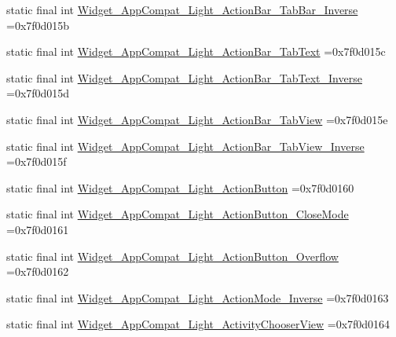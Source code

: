\begin{DoxyCompactItemize}
\item 
static final int \mbox{\hyperlink{classbr_1_1unb_1_1cic_1_1mp_1_1marketmaster_1_1R_1_1style_aef60f9fefc836dc33f25dd8e1fa12448}{Widget\+\_\+\+App\+Compat\+\_\+\+Light\+\_\+\+Action\+Bar\+\_\+\+Tab\+Bar\+\_\+\+Inverse}} =0x7f0d015b
\item 
static final int \mbox{\hyperlink{classbr_1_1unb_1_1cic_1_1mp_1_1marketmaster_1_1R_1_1style_a399c267c6d9f7e46b2148c53fac29347}{Widget\+\_\+\+App\+Compat\+\_\+\+Light\+\_\+\+Action\+Bar\+\_\+\+Tab\+Text}} =0x7f0d015c
\item 
static final int \mbox{\hyperlink{classbr_1_1unb_1_1cic_1_1mp_1_1marketmaster_1_1R_1_1style_a9665ad687a3f128cbe64b39dbbd7872e}{Widget\+\_\+\+App\+Compat\+\_\+\+Light\+\_\+\+Action\+Bar\+\_\+\+Tab\+Text\+\_\+\+Inverse}} =0x7f0d015d
\item 
static final int \mbox{\hyperlink{classbr_1_1unb_1_1cic_1_1mp_1_1marketmaster_1_1R_1_1style_af63349a9ca7a4644861fff2907588634}{Widget\+\_\+\+App\+Compat\+\_\+\+Light\+\_\+\+Action\+Bar\+\_\+\+Tab\+View}} =0x7f0d015e
\item 
static final int \mbox{\hyperlink{classbr_1_1unb_1_1cic_1_1mp_1_1marketmaster_1_1R_1_1style_aece7864dafcab4dac5964c53e0a3f5a1}{Widget\+\_\+\+App\+Compat\+\_\+\+Light\+\_\+\+Action\+Bar\+\_\+\+Tab\+View\+\_\+\+Inverse}} =0x7f0d015f
\item 
static final int \mbox{\hyperlink{classbr_1_1unb_1_1cic_1_1mp_1_1marketmaster_1_1R_1_1style_a11ccd68e4f3c8396613c5d206d93fbd7}{Widget\+\_\+\+App\+Compat\+\_\+\+Light\+\_\+\+Action\+Button}} =0x7f0d0160
\item 
static final int \mbox{\hyperlink{classbr_1_1unb_1_1cic_1_1mp_1_1marketmaster_1_1R_1_1style_a08ef8c377417fb9c9674d9c897ebcbbe}{Widget\+\_\+\+App\+Compat\+\_\+\+Light\+\_\+\+Action\+Button\+\_\+\+Close\+Mode}} =0x7f0d0161
\item 
static final int \mbox{\hyperlink{classbr_1_1unb_1_1cic_1_1mp_1_1marketmaster_1_1R_1_1style_abc4e7b8ffc279bff4f242a7a3eeb0754}{Widget\+\_\+\+App\+Compat\+\_\+\+Light\+\_\+\+Action\+Button\+\_\+\+Overflow}} =0x7f0d0162
\item 
static final int \mbox{\hyperlink{classbr_1_1unb_1_1cic_1_1mp_1_1marketmaster_1_1R_1_1style_a4e9e56f0e02ee452f40810488b159f13}{Widget\+\_\+\+App\+Compat\+\_\+\+Light\+\_\+\+Action\+Mode\+\_\+\+Inverse}} =0x7f0d0163
\item 
static final int \mbox{\hyperlink{classbr_1_1unb_1_1cic_1_1mp_1_1marketmaster_1_1R_1_1style_a91a5b8fe4a085a860a242664cbd7ebec}{Widget\+\_\+\+App\+Compat\+\_\+\+Light\+\_\+\+Activity\+Chooser\+View}} =0x7f0d0164

\end{DoxyCompactItemize}
